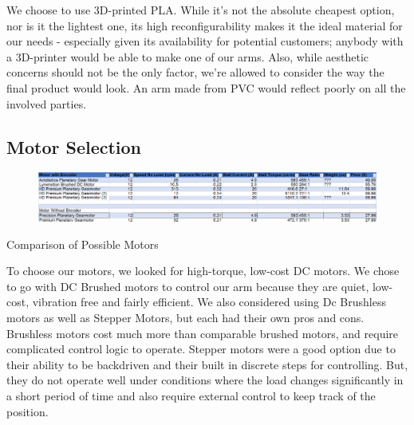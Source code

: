 





We choose to use 3D-printed PLA. While it's not the absolute cheapest option, nor is it the lightest one, its high reconfigurability makes it the ideal material for our needs - especially given its availability for potential customers; anybody with a 3D-printer would be able to make one of our arms. Also, while aesthetic concerns should not be the only factor, we're allowed to consider the way the final product would look. An arm made from PVC would reflect poorly on all the involved parties.


\subsection{Motor Selection}
\begin{table}[H]
	\begin{figure}[H]
		\includegraphics[width=\textwidth]{Pictures/motor_chart}
	\end{figure}
	\caption{Comparison of Possible Motors}
	\label{tbl:Motor_Chart}
\end{table}


To choose our motors, we looked for high-torque, low-cost DC motors. We chose to go with DC Brushed motors to control our arm because they are quiet, low-cost, vibration free and fairly efficient. We also considered using Dc Brushless motors as well as Stepper Motors, but each had their own pros and cons. Brushless motors cost much more than comparable brushed motors, and require complicated control logic to operate. Stepper motors were a good option due to their ability to be backdriven and their built in discrete steps for controlling. But, they do not operate well under conditions where the load changes significantly in a short period of time and also require external control to keep track of the position.


